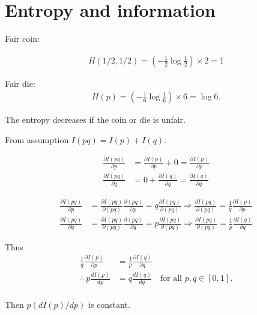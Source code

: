\chapter{Entropy and information}
Fair coin:

\begin{align}
    H({1/2, 1/2}) = \left( - \frac{1}{2} \log \frac{1}{2} \right) \times 2 = 1
\end{align}


Fair die:
\begin{align}
    H(p) = \left( - \frac{1}{6} \log \frac{1}{6} \right) \times 6 = \log 6.
\end{align}


The entropy decreases if the coin or die is unfair.




From assumption $I(pq) = I(p) + I(q)$.

\begin{align}
    \frac{\partial I(pq)}{\partial p} &= \frac{\partial I(p)}{\partial p} + 0 = \frac{\partial I(p)}{\partial p}\\
    \frac{\partial I(pq)}{\partial q} &= 0 + \frac{\partial I(q)}{\partial q} = \frac{\partial I(q)}{\partial q}
\end{align}


\begin{align}
    \frac{\partial I(pq)}{\partial p}
        &=  \frac{\partial I(pq)}{\partial (pq)} \frac{\partial (pq)}{\partial p}
        = q \frac{\partial I(pq)}{\partial(pq)}
    \Rightarrow \frac{\partial I(pq)}{\partial(pq)} = \frac{1}{q} \frac{\partial I(p)}{\partial p}\\
%
    \frac{\partial I(pq)}{\partial q}
        &=  \frac{\partial I(pq)}{\partial (pq)} \frac{\partial (pq)}{\partial q}
        = p \frac{\partial I(pq)}{\partial(pq)}
    \Rightarrow \frac{\partial I(pq)}{\partial(pq)} = \frac{1}{p} \frac{\partial I(q)}{\partial q}
\end{align}

Thus
\begin{align}
    \frac{1}{q} \frac{\partial I(p)}{\partial p} &= \frac{1}{p} \frac{\partial I(q)}{\partial q}\\
    \therefore~ p \frac{d I(p)}{d p} &= q \frac{d I(q)}{d q} ~~~\text{ for all } p,q \in [0,1].\\
\end{align}

Then $p (d I(p) / d p)$ is constant.

